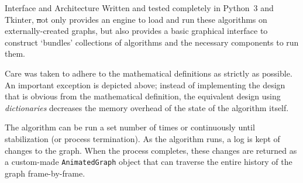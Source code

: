 \documentclass{beamer}
\begin{document}
\begin{frame}[fragile,t]
\begin{columns}[t]
\begin{column}{.45\textwidth}
\begin{block}{Interface and Architecture}
        Written and tested completely in Python~3 and Tkinter,
          \st not only provides an engine to load and
          run these algorithms on externally-created graphs,
          but also provides a basic graphical interface
          to construct `bundles' \Dash collections of algorithms
          and the necessary components to run them.
          \begin{center}
          \end{center}
        Care was taken to adhere to the mathematical definitions
          as strictly as possible.
        An important exception is depicted above;
          instead of implementing the design that
          is obvious from the mathematical definition,
          the equivalent design using \emph{dictionaries}
          decreases the memory overhead of the state
          of the algorithm itself.

        \vspace{.15in}

        The algorithm can be run a set number of times or continuously
        until stabilization (or process termination).  As the
        algorithm runs, a log is kept of changes to the graph.  When
        the process completes, these changes are returned as a
        custom-made \texttt{AnimatedGraph} object that can traverse
        the entire history of the graph frame-by-frame.
      \end{block}
    \end{column}
  \end{columns}
\end{frame}
\end{document}
